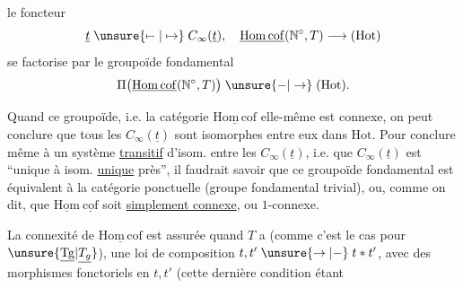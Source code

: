 le foncteur
\[
\underline t\mathrel{\unsure{\mapstochar\relbar|\mapsto}}C_\infty(\underline t),\quad
\underline{\mathrm{Hom\,cof}}(\mathbb N^\circ,T)\longrightarrow(\mathrm{Hot})
\]
se factorise par le groupoïde fondamental
\[
\Pi\bigl(\underline{\mathrm{Hom\,cof}}(\mathbb N^\circ,T)\bigr)\mathrel{\unsure{-|\to}}(\mathrm{Hot}).
\]

Quand ce groupoïde, i.e.  la catégorie $\underline{\mathrm{Hom\,cof}}$ elle-même est connexe, on peut  conclure que tous les $C_\infty(\underline t)$ sont isomorphes entre eux dans $\mathrm{Hot}$. Pour conclure même à un système \uline{transitif} d'isom. entre les $C_\infty(\underline t)$, i.e. que $C_\infty(\underline t)$ est ``unique à isom. \uline{unique} près'', il faudrait savoir  que ce groupoïde fondamental est  équivalent à la catégorie ponctuelle (groupe fondamental trivial), ou, comme on dit, que $\underline{\mathrm{Hom}}\ \underline{\mathrm{cof}}$ soit \uline{simplement connexe}, ou $1$-connexe.

La connexité de $\underline{\mathrm{Hom\,cof}}$ est assurée quand  $T$ a (comme c'est le cas pour $\unsure{\underline{\mathrm{Tg}}|\underline{T_g}}$), une loi de composition $t,t'\mathrel{\unsure{\to|-}}t*t'$, avec des morphismes fonctoriels en $t,t'$
(cette dernière condition étant 
